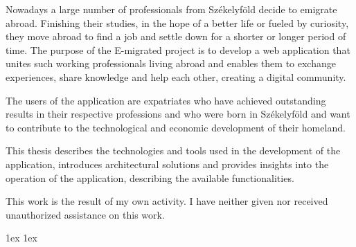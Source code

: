\documentclass[final]{ubb_dolgozat}
\begin{document}
\begin{abstractEN} %


Nowadays a large number of professionals from Székelyföld decide to emigrate abroad. Finishing their studies, in the hope of a better life or fueled by curiosity, they move abroad to find a job and settle down for a shorter or longer period of time. The purpose of the E-migrated project is to develop a web application that unites such working professionals living abroad and enables them to exchange experiences, share knowledge and help each other, creating a digital community.

The users of the application are expatriates who have achieved outstanding results in their respective professions and who were born in Székelyföld and want to contribute to the technological and economic development of their homeland.

This thesis describes the technologies and tools used in the development of the application, introduces architectural solutions and provides insights into the operation of the application, describing the available functionalities.
\vspace*{.5cm}

This work is the result of my own activity. I have neither given nor received unauthorized assistance on this work.

\end{abstractEN}

\maketitle


{ \baselineskip 1ex
  \parskip 1ex
  \tableofcontents
}



















\appendix



{ \renewcommand{\baselinestretch}{0.8}
  \normalsize 
  \setlength{\itemsep}{-2.4mm}
  \setlength{\bibspacing}{0.67\baselineskip}
  
  
}
\end{document}

